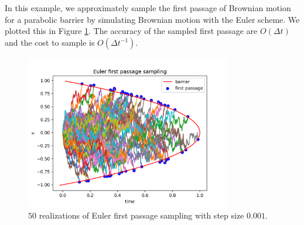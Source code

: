 \documentclass[a4paper,12pt]{article}
\begin{document}
\begin{example} \label{ex:euler first passage sampling}
  In this example, we approximately sample the first passage of Brownian motion
  for a parabolic barrier by simulating Brownian motion with the Euler scheme. We plotted
  this in Figure \ref{fig:Euler first passage para}. The accuracy of the sampled first passage
  are $O(\Delta t)$ and the cost to sample is $O(\Delta t ^{-1})$.

  \begin{figure}[h!]
    \centering
    \includegraphics[width=0.8\textwidth]{plots/Euler_first_passage_para.png}
    \caption{ $50$ realizations of Euler first passage sampling with step size $0.001$.}
    \label{fig:Euler first passage para}
  \end{figure}
\end{example}
\end{document}
